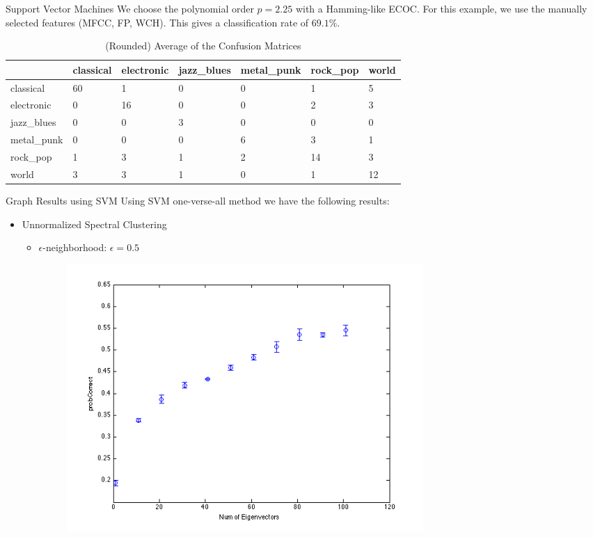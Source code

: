 \documentclass[xcolor=dvipsnames,t]{beamer} %
\begin{document}
\begin{frame}[shrink=20]{Support Vector Machines}
   We choose the polynomial order $p=2.25$ with a Hamming-like ECOC.  For this example, we use the manually selected features (MFCC, FP, WCH).  This gives a classification rate of $69.1\%$.

   \begin{table}[h!]
      \centering
         \begin{tabular}{ l||l | l | l | l | l | l | }
         & classical & electronic & jazz\_blues & metal\_punk & rock\_pop & world\\\hline
         classical & 60 &1 &0 &0 &1 &5 \\ \hline 
         electronic & 0 &16 &0 &0 &2 &3 \\ \hline 
         jazz\_blues & 0 &0 &3 &0 &0 &0 \\ \hline 
         metal\_punk & 0 &0 &0 &6 &3 &1 \\ \hline 
         rock\_pop & 1 &3 &1 &2 &14 &3 \\ \hline 
         world & 3 &3 &1 &0 &1 &12 \\ \hline 
         \end{tabular}
      \caption{(Rounded) Average of the Confusion Matrices}
   \end{table}
\end{frame}




\begin{frame}{Graph Results using SVM}
Using SVM one-verse-all method we have the following results: 
\begin{itemize}
\item Unnormalized Spectral Clustering 
\begin{itemize}
\item $\epsilon$-neighborhood: $\epsilon = 0.5$
\begin{figure}[h!]
\centering
  \centering
    \includegraphics[width=0.7\textwidth]{figures/plotopt1e5.png}
\end{figure}
\end{itemize}
\end{itemize}

\end{frame}
\end{document}
